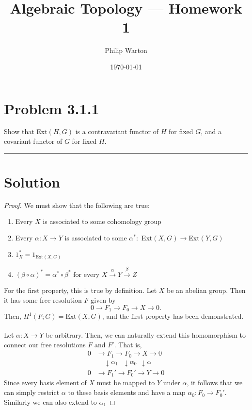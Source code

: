 \documentclass{article}
\theoremstyle{definition}
\begin{document}
\title{Algebraic Topology --- Homework 1}
\author{Philip Warton}
\date{\today}
\maketitle

\section*{Problem 3.1.1}
Show that Ext$(H,G)$ is a contravariant functor of $H$ for fixed $G$, 
and a covariant functor of $G$ for fixed $H$.
\\
\par\noindent\rule{\textwidth}{0.4pt}
\section*{Solution}
\begin{proof}
    We must show that the following are true:
    \begin{enumerate}
        \item Every $X$ is associated to some cohomology group
        \item Every $\alpha : X \rightarrow Y$ is associated to some $\alpha^* :$ Ext$(X,G) \rightarrow $Ext$(Y,G)$
        \item $1_X^* = 1_{\text{Ext}(X,G)}$ 
        \item $(\beta \circ \alpha)^* = \alpha^* \circ \beta^*$ for every $X \xrightarrow{\alpha} Y \xrightarrow{\beta} Z$
    \end{enumerate}
    For the first property, this is true by definition.
    Let $X$ be an abelian group. Then it has some free resolution $F$ given by
    \[
        0 \to F_1 \to F_0 \to X \to 0   
    .\]
    Then, $H^1(F;G) = \text{Ext}(X,G)$, and the first property has been demonstrated.
    \\\\
    Let $\alpha : X \rightarrow Y$ be arbitrary.
    Then, we can naturally extend this homomorphism to connect our 
    free resolutions $F$ and $F'$. That is,
    \begin{align*}
        0 &\to F_1 \to F_0 \to X \to 0 \\
        & \ \ \ \ \ \downarrow\alpha_1 \ \ \ \downarrow\alpha_0 \ \ \downarrow\alpha \\
        0 &\to F_1' \to F_0' \to Y \to 0
    \end{align*}
    Since every basis element of $X$ must be mapped to $Y$ under $\alpha$,
    it follows that we can simply restrict $\alpha$ to these basis elements and have a
    map $\alpha_0 : F_0 \to F_0'$. Similarly we can also extend to $\alpha_1$
\end{proof}
\end{document}
